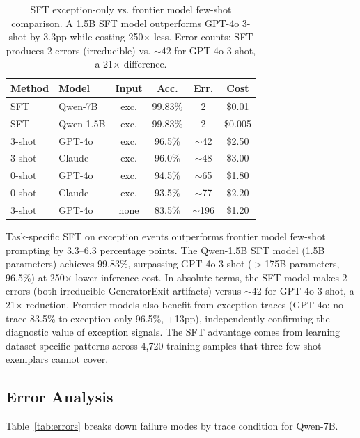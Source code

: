 \documentclass[11pt,a4paper]{article}
\begin{document}
\begin{table}[t]
\centering
\small
\setlength{\tabcolsep}{3pt}
\begin{tabular}{llcccc}
\toprule
\textbf{Method} & \textbf{Model} & \textbf{Input} & \textbf{Acc.} & \textbf{Err.} & \textbf{Cost} \\
\midrule
SFT & Qwen-7B & exc. & 99.83\% & 2 & \$0.01 \\
SFT & Qwen-1.5B & exc. & 99.83\% & 2 & \$0.005 \\
3-shot & GPT-4o & exc. & 96.5\% & $\sim$42 & \$2.50 \\
3-shot & Claude & exc. & 96.0\% & $\sim$48 & \$3.00 \\
0-shot & GPT-4o & exc. & 94.5\% & $\sim$65 & \$1.80 \\
0-shot & Claude & exc. & 93.5\% & $\sim$77 & \$2.20 \\
3-shot & GPT-4o & none & 83.5\% & $\sim$196 & \$1.20 \\
\bottomrule
\end{tabular}
\caption{SFT exception-only vs. frontier model few-shot comparison. A 1.5B SFT model outperforms GPT-4o 3-shot by 3.3pp while costing 250$\times$ less. Error counts: SFT produces 2 errors (irreducible) vs. $\sim$42 for GPT-4o 3-shot, a 21$\times$ difference.}
\label{tab:frontier}
\end{table}

Task-specific SFT on exception events outperforms frontier model few-shot prompting by 3.3--6.3 percentage points. The Qwen-1.5B SFT model (1.5B parameters) achieves 99.83\%, surpassing GPT-4o 3-shot ($>$175B parameters, 96.5\%) at 250$\times$ lower inference cost. In absolute terms, the SFT model makes 2 errors (both irreducible GeneratorExit artifacts) versus $\sim$42 for GPT-4o 3-shot, a 21$\times$ reduction. Frontier models also benefit from exception traces (GPT-4o: no-trace 83.5\% to exception-only 96.5\%, +13pp), independently confirming the diagnostic value of exception signals. The SFT advantage comes from learning dataset-specific patterns across 4,720 training samples that three few-shot exemplars cannot cover.

\subsection{Error Analysis}
\label{sec:errors}

Table~\ref{tab:errors} breaks down failure modes by trace condition for Qwen-7B.
\end{document}
